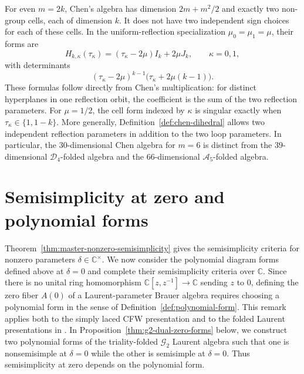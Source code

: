 \documentclass[11pt,a4paper]{amsart}
\theoremstyle{uprightdefinition}
\theoremstyle{remark}\newtheorem{remark}[theorem]{Remark}
\begin{document}
For even $m=2k$, Chen's algebra has dimension $2m+m^2/2$ and exactly two
non-group cells, each of dimension $k$. It does not have two independent
sign choices for each of these cells. In the uniform-reflection
specialization $\mu_0=\mu_1=\mu$, their forms are
\[
 H_{k,\kappa}(\tau_{\kappa})=(\tau_{\kappa}-2\mu)I_k+2\mu J_k,
 \qquad \kappa=0,1,
\]
with determinants
\[
 (\tau_{\kappa}-2\mu)^{k-1}\bigl(\tau_{\kappa}+2\mu(k-1)\bigr).
\]
These formulas follow directly from Chen's multiplication: for distinct
hyperplanes in one reflection orbit, the coefficient is the sum of the
two reflection parameters. For $\mu=1/2$, the cell form indexed by
$\kappa$ is singular exactly when $\tau_{\kappa}\in\{1,1-k\}$.
More generally, Definition~\ref{def:chen-dihedral} allows two independent reflection
parameters in addition to the two loop parameters. In particular, the
$30$-dimensional Chen algebra for $m=6$ is distinct from the
$39$-dimensional $\mathscr{D}_4$-folded algebra and the $66$-dimensional
$\mathscr{A}_5$-folded algebra.



\section{Semisimplicity at zero and polynomial forms}
\label{sec:further-results}\label{subsec:master-zero}
Theorem~\ref{thm:master-nonzero-semisimplicity} gives the semisimplicity criteria for nonzero
parameters $\delta\in\mathbb C^\times$. We now consider the polynomial diagram forms defined above
at $\delta=0$ and complete their semisimplicity criteria over $\mathbb C$.
Since there is no unital ring homomorphism $\mathbb C[z,z^{-1}]\to\mathbb C$
sending $z$ to $0$, defining the zero fiber $A(0)$ of a Laurent-parameter Brauer algebra requires choosing a polynomial form in the sense
of Definition~\ref{def:polynomial-form}. This remark applies both to the
simply laced CFW presentation and to the folded Laurent presentations in
\cite{CFW2009,CohenLiu2014,LiuF42013,LiuG22015,Liu2016}.
In Proposition~\ref{thm:g2-dual-zero-forms} below, we construct two polynomial forms
of the triality-folded $\mathscr{G}_2$ Laurent algebra such that one is nonsemisimple at $\delta=0$ while the other is semisimple at $\delta=0$. Thus semisimplicity at zero depends on the polynomial form.
\end{document}
